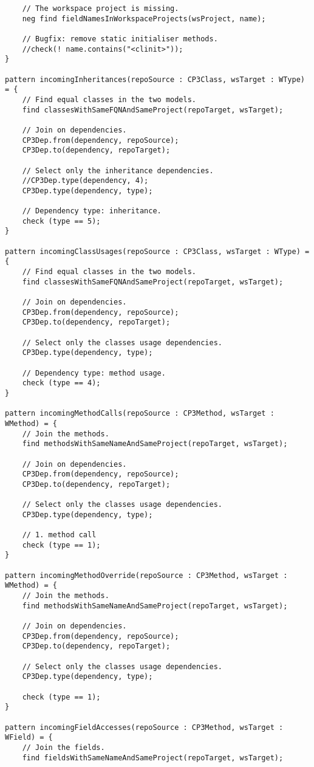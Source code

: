 \begin{lstlisting}
	// The workspace project is missing.
	neg find fieldNamesInWorkspaceProjects(wsProject, name);

	// Bugfix: remove static initialiser methods.
	//check(! name.contains("<clinit>"));
}

pattern incomingInheritances(repoSource : CP3Class, wsTarget : WType) = {
	// Find equal classes in the two models. 
	find classesWithSameFQNAndSameProject(repoTarget, wsTarget);

	// Join on dependencies.
	CP3Dep.from(dependency, repoSource);
	CP3Dep.to(dependency, repoTarget);

	// Select only the inheritance dependencies.
	//CP3Dep.type(dependency, 4);
	CP3Dep.type(dependency, type);
	
	// Dependency type: inheritance.
	check (type == 5);
}

pattern incomingClassUsages(repoSource : CP3Class, wsTarget : WType) = {
	// Find equal classes in the two models. 
	find classesWithSameFQNAndSameProject(repoTarget, wsTarget);

	// Join on dependencies.
	CP3Dep.from(dependency, repoSource);
	CP3Dep.to(dependency, repoTarget);

	// Select only the classes usage dependencies.
	CP3Dep.type(dependency, type);
	
	// Dependency type: method usage.
	check (type == 4);
}

pattern incomingMethodCalls(repoSource : CP3Method, wsTarget : WMethod) = {
	// Join the methods.
	find methodsWithSameNameAndSameProject(repoTarget, wsTarget);

	// Join on dependencies.
	CP3Dep.from(dependency, repoSource);
	CP3Dep.to(dependency, repoTarget);

	// Select only the classes usage dependencies.
	CP3Dep.type(dependency, type);
	
	// 1. method call
	check (type == 1);
}

pattern incomingMethodOverride(repoSource : CP3Method, wsTarget : WMethod) = {
	// Join the methods.
	find methodsWithSameNameAndSameProject(repoTarget, wsTarget);

	// Join on dependencies.
	CP3Dep.from(dependency, repoSource);
	CP3Dep.to(dependency, repoTarget);

	// Select only the classes usage dependencies.
	CP3Dep.type(dependency, type);
	
	check (type == 1);
}

pattern incomingFieldAccesses(repoSource : CP3Method, wsTarget : WField) = {
	// Join the fields.
	find fieldsWithSameNameAndSameProject(repoTarget, wsTarget);


\end{lstlisting}
